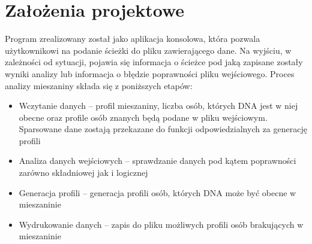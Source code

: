 \documentclass[11pt,a4paper]{article}
\begin{document}
\section{Założenia projektowe}
Program zrealizowany został jako aplikacja konsolowa, która pozwala użytkownikowi na podanie ścieżki do pliku zawierającego dane. Na wyjściu, w zależności od sytuacji, pojawia się informacja o ścieżce pod jaką zapisane zostały wyniki analizy lub informacja o błędzie poprawności pliku wejściowego. Proces analizy mieszaniny składa się z poniższych etapów:
\begin{itemize}
\item Wczytanie danych -- profil mieszaniny, liczba osób, których DNA jest w niej obecne oraz profile osób znanych będą podane w pliku wejściowym. Sparsowane dane zostają przekazane do funkcji odpowiedzialnych za generację profili
\item Analiza danych wejściowych -- sprawdzanie danych pod kątem poprawności zarówno składniowej jak i logicznej
\item Generacja profili -- generacja profili osób, których DNA może być obecne w mieszaninie
\item Wydrukowanie danych -- zapis do pliku możliwych profili osób brakujących w mieszaninie
\end{itemize}
\end{document}
